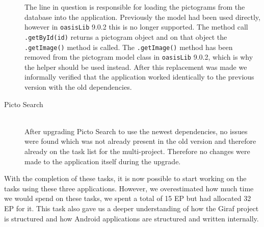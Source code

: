 \begin{description}
    The line in question is responsible for loading the pictograms from the database into the application. 
    Previously the model had been used directly, however in \texttt{oasisLib} 9.0.2 this is no longer supported. 
    The method call \texttt{.getById(id)} returns a pictogram object and on that object the \texttt{.getImage()} method is called. 
    The \texttt{.getImage()} method has been removed from the pictogram model class in \texttt{oasisLib} 9.0.2, which is why the helper should be used instead. 
    After this replacement was made we informally verified that the application worked identically to the previous version with the old dependencies. 
    
    \item[Picto Search] \hfill \\
    After upgrading Picto Search to use the newest dependencies, no issues were found which was not already present in the old version and therefore already on the task list for the multi-project. 
    Therefore no changes were made to the application itself during the upgrade. 
\end{description}

 With the completion of these tasks, it is now possible to start working on the tasks using these three applications. 
 However, we overestimated how much time we would spend on these tasks, we spent a total of 15 EP but had allocated 32 EP for it. 
 This task also gave us a deeper understanding of how the Giraf project is structured and how Android applications are structured and written internally. 
